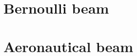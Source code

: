\documentclass[letterpaper,10pt,english]{jupyterBook}
\begin{document}
\section{Bernoulli beam}
\label{\detokenize{ch/solids/beams/bernoulli:bernoulli-beam}}\label{\detokenize{ch/solids/beams/bernoulli:solid-mechanics-small-displacements-beams-bernoulli}}\label{\detokenize{ch/solids/beams/bernoulli::doc}}
\sphinxstepscope


\section{Aeronautical beam}
\label{\detokenize{ch/solids/beams/aeronautical:aeronautical-beam}}\label{\detokenize{ch/solids/beams/aeronautical:solid-mechanics-small-displacements-beams-aeronautical}}\label{\detokenize{ch/solids/beams/aeronautical::doc}}
\sphinxstepscope
\end{document}
